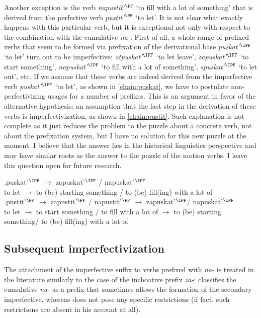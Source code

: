 Another exception is the verb \textit{napustit'}$^{\PF}$ `to fill with a lot of something' that is derived from the perfective verb \textit{pustit'}$^{\PF}$ `to let'. It is not clear what exactly happens with this particular verb, but it is exceptional not only with respect to the combination with the cumulative \textit{na-}. First of all, a whole range of prefixed verbs that seem to be formed via prefixation of the derivational base \textit{puskat'}$^{\IPF}$ `to let' turn out to be imperfective: \textit{otpuskat'}$^{\IPF}$ `to let leave', \textit{zapuskat'}$^{\IPF}$ `to start something', \textit{napuskat'}$^{\IPF}$ `to fill with a lot of something', \textit{spuskat'}$^{\IPF}$ `to let out', etc. If we assume that these verbs are indeed derived from the imperfective verb \textit{puskat'}$^{\IPF}$ `to let', as shown in \ref{chain:puskat}, we have to postulate non-perfectivizing usages for a number of prefixes. This is an argument in favor of the alternative hypothesis: an assumption that the last step in the derivation of these verbs is imperfectivization, as shown in \ref{chain:pustit}. Such explanation is not complete as it just reduces the problem to the puzzle about a concrete verb, not about the prefixation system, but I have no solution for this new puzzle at the moment. I believe that the answer lies in the historical linguistics perspective and may have similar roots as the answer to the puzzle of the motion verbs. I leave this question open for future research.

\exg.puskat'$^{\IPF}$ $\rightarrow$ zapuskat'$^{\IPF}$ / napuskat'$^{\IPF}$ \label{chain:puskat}\\
{to let} $\rightarrow$ {to (be) starting something} / {to (be) fill(ing) with a lot of}\\

\exg.pustit'$^{\PF}$ $\rightarrow$ zapustit'$^{\PF}$ / napustit'$^{\PF}$ $\rightarrow$ zapuskat'$^{\IPF}$/ napuskat'$^{\IPF}$ \label{chain:pustit}\\
{to let} $\rightarrow$ {to start something} / {to fill with a lot of} $\rightarrow$ {to (be) starting something/} {to (be) fill(ing) with a lot of}\\

\subsection{Subsequent imperfectivization}
The attachment of the imperfective suffix to verbs prefixed with \textit{na-} is treated in the literature similarly to the case of the inchoative prefix \textit{za-}: \citet[230]{Svenonius:04b} classifies the cumulative \textit{na-} as a prefix that sometimes allows the formation of the secondary imperfective, whereas \citet{Tatevosov:09} does not pose any specific restrictions (if fact, such restrictions are absent in his account at all).

